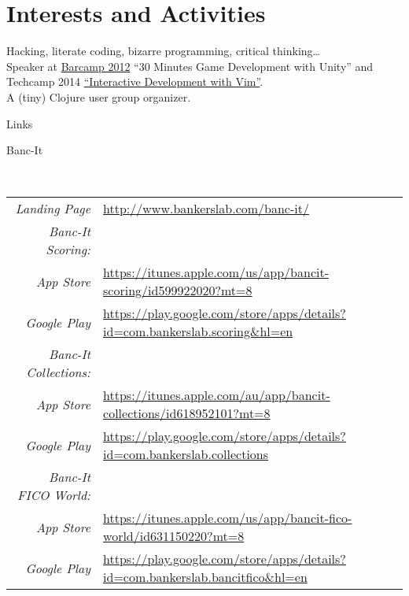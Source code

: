 \documentclass[a4paper,10pt]{article}
\begin{document}
\section{Interests and Activities}
Hacking, literate coding, bizarre programming, critical thinking\ldots\\
Speaker at \href{http://www.barcampsaigon.org/2012/09/thank-you-barcampers-sponsors-volunteers/}{Barcamp 2012} ``30 Minutes Game Development with Unity'' and Techcamp 2014 \href{http://www.slideshare.net/huylenq/interactive-development-with-vim-techcamp}{``Interactive Development with Vim''}.\\
A (tiny) Clojure user group organizer.\\

\newpage
\par{\centering\LARGE{Links} \par}
\hfill
\par{\centering\Large \hypertarget{bancit-links}{Banc-It}\par}
\hrulefill\\
\newline
\begin{tabular}{rl}
    \textit{Landing Page} & \url{http://www.bankerslab.com/banc-it/}\\
    \textit{Banc-It Scoring:}\\
        \textit{App Store} & \small \url{https://itunes.apple.com/us/app/bancit-scoring/id599922020?mt=8}\\
        \textit{Google Play} & \small \url{https://play.google.com/store/apps/details?id=com.bankerslab.scoring\&hl=en}\\
    \textit{Banc-It Collections:}\\
        \textit{App Store} & \small \url{https://itunes.apple.com/au/app/bancit-collections/id618952101?mt=8}\\
        \textit{Google Play} & \small \url{https://play.google.com/store/apps/details?id=com.bankerslab.collections}\\
    \textit{Banc-It FICO World:}\\
        \textit{App Store} & \small \url{https://itunes.apple.com/us/app/bancit-fico-world/id631150220?mt=8}\\
        \textit{Google Play} & \small \url{https://play.google.com/store/apps/details?id=com.bankerslab.bancitfico&hl=en}
\end{tabular}
\end{document}
